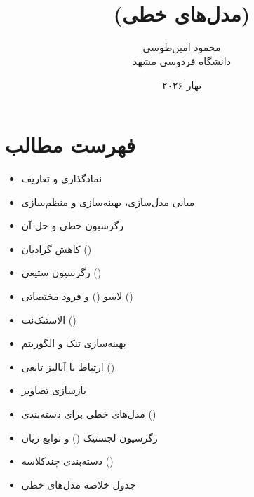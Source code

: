 \documentclass{article}
\title{\lr{Linear models} \\ (مدل‌های خطی)}
\author{محمود امین‌طوسی \\ دانشگاه فردوسی مشهد}
\date{بهار ۲۰۲۶}
\begin{document}
\maketitle

\section*{فهرست مطالب}
\begin{itemize}
    \item نمادگذاری و تعاریف
    \item مبانی مدل‌سازی، بهینه‌سازی و منظم‌سازی
    \item رگرسیون خطی و حل آن
    \item کاهش گرادیان ()
    \item رگرسیون ستیغی ()
    \item لاسو () و فرود مختصاتی ()
    \item الاستیک‌نت ()
    \item بهینه‌سازی تنک و الگوریتم 
    \item ارتباط با آنالیز تابعی ()
    \item بازسازی تصاویر 
    \item مدل‌های خطی برای دسته‌بندی ()
    \item رگرسیون لجستیک () و توابع زیان
    \item دسته‌بندی چندکلاسه ()
    \item جدول خلاصه مدل‌های خطی
\end{itemize}

\newpage
\end{document}
